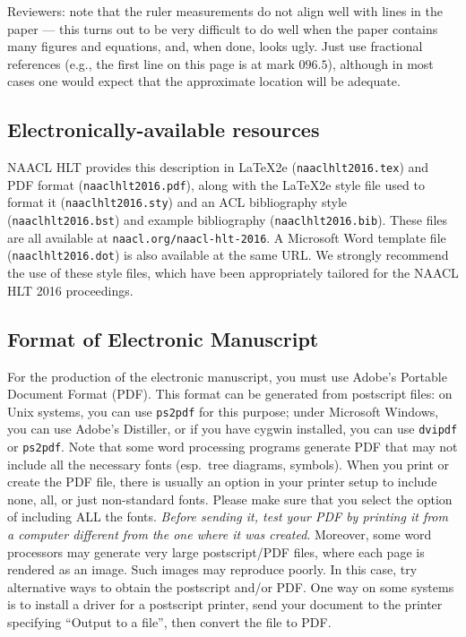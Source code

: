 \documentclass{article}
\begin{document}
Reviewers:
note that the ruler measurements do not align well with lines in the paper
--- this turns out to be very difficult to do well when the paper contains
many figures and equations, and, when done, looks ugly.  Just use fractional
references (e.g., the first line on this page is at mark $096.5$), although in most cases one would
expect that the approximate location will be adequate.

\subsection{Electronically-available resources}

NAACL HLT provides this description in \LaTeX2e{} ({\small\tt naaclhlt2016.tex}) and PDF
format ({\small\tt naaclhlt2016.pdf}), along with the \LaTeX2e{} style file used to
format it ({\small\tt naaclhlt2016.sty}) and an ACL bibliography style ({\small\tt naaclhlt2016.bst})
and example bibliography ({\small\tt naaclhlt2016.bib}).
These files are all available at
{\small\tt naacl.org/naacl-hlt-2016}.  A Microsoft Word
template file ({\small\tt naaclhlt2016.dot}) is also available at the same URL. We
strongly recommend the use of these style files, which have been
appropriately tailored for the NAACL HLT 2016 proceedings.

\subsection{Format of Electronic Manuscript}
\label{sect:pdf}

For the production of the electronic manuscript, you must use Adobe's
Portable Document Format (PDF). This format can be generated from
postscript files: on Unix systems, you can use {\small\tt ps2pdf} for this
purpose; under Microsoft Windows, you can use Adobe's Distiller, or
if you have cygwin installed, you can use {\small\tt dvipdf} or
{\small\tt ps2pdf}.  Note 
that some word processing programs generate PDF that may not include
all the necessary fonts (esp.\ tree diagrams, symbols). When you print
or create the PDF file, there is usually an option in your printer
setup to include none, all, or just non-standard fonts.  Please make
sure that you select the option of including ALL the fonts.  {\em
  Before sending it, test your {\/\em PDF} by printing it from a
  computer different from the one where it was created}. Moreover,
some word processors may generate very large postscript/PDF files,
where each page is rendered as an image. Such images may reproduce
poorly.  In this case, try alternative ways to obtain the postscript
and/or PDF.  One way on some systems is to install a driver for a
postscript printer, send your document to the printer specifying
``Output to a file'', then convert the file to PDF.
\end{document}
